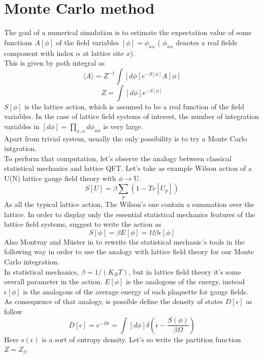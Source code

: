 \section{Monte Carlo method}
The goal of a numerical simulation is to estimate the expectation value of some functions $A[\phi]$ of the field variables $[\phi]={\phi_{x\alpha}}$ 
( $\phi_{x\alpha}$ denotes a real fields component with index $\alpha$ at lattice site $x$). \\
\noindent
This is given by path integral as 
$$
  \langle A \rangle = Z^{-1}\int \left[ d\phi \right] e^{-S[\phi]}A[\phi]
$$
$$
  Z=\int \left[ d\phi \right] e^{-S[\phi]}
$$
$S[\phi]$ is the lattice action, which is assumed to be a real function of the field variables. In the case of lattice field systems of interest, the number of 
integration variables in $\left[ d \phi \right] = \displaystyle\prod_{x,\alpha}^{ } d \phi_{x\alpha}$ is very large. \\
\noindent
Apart from trivial system, usually the only possibility is to try a Monte Carlo intgration. \\
\noindent
To perform that computation, let's observe the analogy between classical statistical mechanics and lattice QFT. 
Let's take as example Wilson action of a U(N) lattice gauge field theory with $\phi\rightarrow$U.
$$
    S[U]=\beta\displaystyle\sum_{p}\left( 1 - Tr[U_p] \right)
$$
\noindent
As all the typical lattice action, The Wilson's one contain a summation over the lattice. In order to display only the essential statistical mechanics 
features of the lattice field systems, \cite{QuanField} suggest to write the action as
$$
    S[\phi]=\beta E[\phi]=\Omega\beta\epsilon[\phi]
$$
\noindent
Also Montvay and Müster in \cite{QuanField} to rewrite the statistical mechanic's tools in the following way in order to use the analogy with lattice
field theory for our Monte Carlo integration. \\
\noindent 
In statistical mechanics, $\beta=1/(K_BT)$, but in lattice field theory it's some overall parameter in the action. $E[\phi]$ is the analogous of the energy,
instead $\epsilon[\phi]$ is the analogous of the average energy of each plaquette for gauge fields.\\
\noindent
As consequence of that analogy, is possible define the density of states $D[\epsilon]$ as follow
$$
    D[\epsilon]=e^{-\Omega\epsilon}=\int\left[ d\phi \right]\delta\left( \epsilon - \frac{S(\phi)}{\beta\Omega}\right)
$$
Here $s(\epsilon)$ is a sort of entropy density. Let's so write the partition function $Z=Z_\beta$
